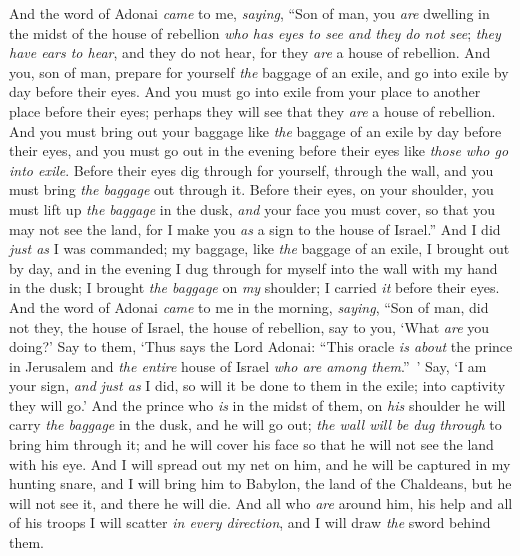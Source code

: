 \begin{biblechapter} %
 And the word of Adonai \textit{came} to me, \textit{saying},
\verse “Son of man, you \textit{are} dwelling in the midst of the house of rebellion \textit{who has eyes to see and they do not see}; \textit{they have ears to hear}, and they do not hear, for they \textit{are} a house of rebellion.
\verse And you, son of man, prepare for yourself \textit{the} baggage of an exile, and go into exile by day before their eyes. And you must go into exile from your place to another place before their eyes; perhaps they will see that they \textit{are} a house of rebellion.
\verse And you must bring out your baggage like \textit{the} baggage of an exile by day before their eyes, and you must go out in the evening before their eyes like \textit{those who go into exile}.
\verse Before their eyes dig through for yourself, through the wall, and you must bring \textit{the baggage} out through it.
\verse Before their eyes, on your shoulder, you must lift up \textit{the baggage} in the dusk, \textit{and} your face you must cover, so that you may not see the land, for I make you \textit{as} a sign to the house of Israel.”
\verse And I did \textit{just as} I was commanded; my baggage, like \textit{the} baggage of an exile, I brought out by day, and in the evening I dug through for myself into the wall with my hand in the dusk; I brought \textit{the baggage} on \textit{my} shoulder; I carried \textit{it} before their eyes.
\verse And the word of Adonai \textit{came} to me in the morning, \textit{saying},
\verse “Son of man, did not they, the house of Israel, the house of rebellion, say to you, ‘What \textit{are} you doing?’
\verse Say to them, ‘Thus says the Lord Adonai: “This oracle \textit{is about} the prince in Jerusalem and \textit{the entire} house of Israel \textit{who are among them}.” ’
\verse Say, ‘I am your sign, \textit{and} \textit{just as} I did, so will it be done to them in the exile; into captivity they will go.’
\verse And the prince who \textit{is} in the midst of them, on \textit{his} shoulder he will carry \textit{the baggage} in the dusk, and he will go out; \textit{the wall will be dug through} to bring him through it; and he will cover his face so that he will not see the land with his eye.
\verse And I will spread out my net on him, and he will be captured in my hunting snare, and I will bring him to Babylon, the land of the Chaldeans, but he will not see it, and there he will die.
\verse And all who \textit{are} around him, his help and all of his troops I will scatter \textit{in every direction}, and I will draw \textit{the} sword behind them.

\end{biblechapter}
